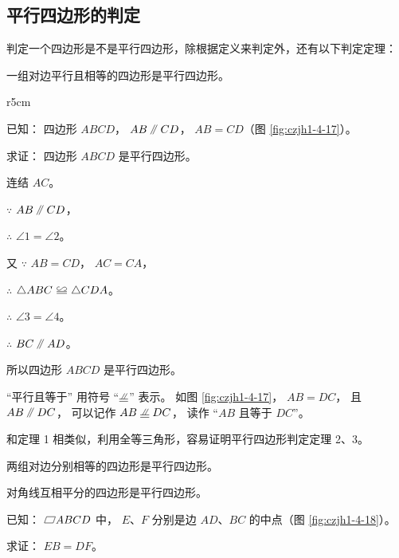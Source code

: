 \subsection{平行四边形的判定}\label{subsec:czjh1-4-4}

判定一个四边形是不是平行四边形，除根据定义来判定外，还有以下判定定理：

\begin{dingli}[平行四边形判定定理1]
    一组对边平行且相等的四边形是平行四边形。
\end{dingli}

\begin{wrapfigure}[8]{r}{5cm}
    \centering
    
    \caption{}\label{fig:czjh1-4-17}
\end{wrapfigure}

已知： 四边形 $ABCD$， $AB \pingxing CD$， $AB = CD$（图 \ref{fig:czjh1-4-17}）。

求证： 四边形 $ABCD$ 是平行四边形。

\zhengming 连结 $AC$。

$\because$ \quad $AB \pingxing CD$，

$\therefore$ \quad $\angle 1 = \angle 2$。

又 $\because$ \quad $AB = CD$， $AC = CA$，

$\therefore$ \quad $\triangle ABC \quandeng \triangle CDA$。

$\therefore$ \quad $\angle 3 = \angle 4$。

$\therefore$ \quad $BC \pingxing AD$。

所以四边形 $ABCD$ 是平行四边形。

“平行且等于” 用符号 “$\pxqdy$”  表示。
如图 \ref{fig:czjh1-4-17}， $AB = DC$， 且 $AB \pingxing DC$， 可以记作 $AB \pxqdy DC$，
读作 “$AB$ 且等于 $DC$”。

和定理 1 相类似，利用全等三角形，容易证明平行四边形判定定理 2、3。

\begin{dingli}[平行四边形判定定理2]
    两组对边分别相等的四边形是平行四边形。
\end{dingli}

\begin{dingli}[平行四边形判定定理3]
    对角线互相平分的四边形是平行四边形。
\end{dingli}



\liti 已知： $\pxsbx ABCD$ 中， $E$、$F$ 分别是边 $AD$、$BC$ 的中点（图 \ref{fig:czjh1-4-18}）。

求证： $EB = DF$。

